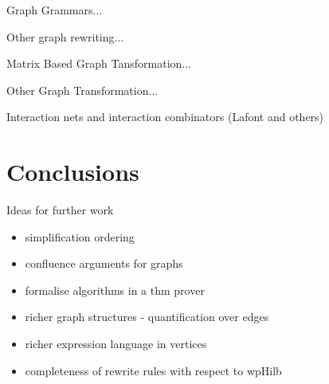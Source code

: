\documentclass[runningheads]{llncs}
\begin{document}
Graph Grammars...

Other graph rewriting... 

Matrix Based Graph Tansformation...

Other Graph Transformation...

Interaction nets and interaction combinators (Lafont and others)

\section{Conclusions}
\label{sec:conclusions}

Ideas for further work
\begin{itemize}
\item simplification ordering
\item confluence arguments for graphs
\item formalise algorithms in a thm prover
\item richer graph structures - quantification over edges
\item richer expression language in vertices
\item completeness of rewrite rules with respect to wpHilb
\end{itemize}




\end{document}
